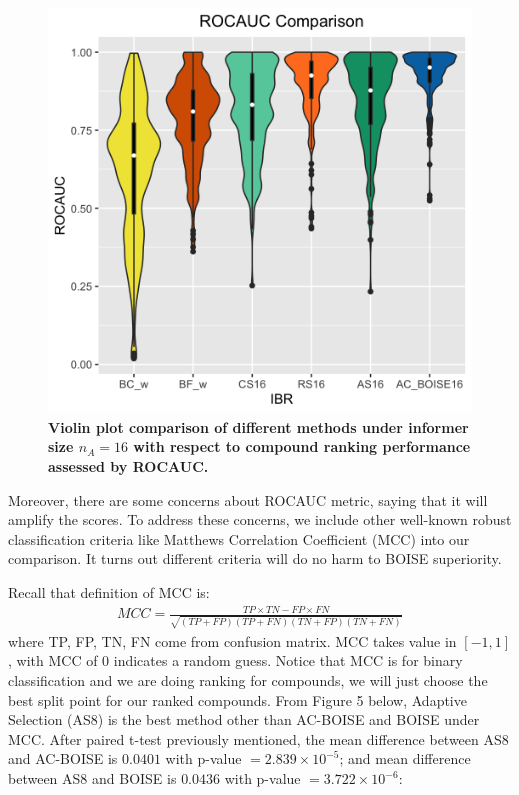 \documentclass[12pt]{article}
\begin{document}
\begin{figure}[!ht]
\caption{\label{fig:auc2} 
{\bf Violin plot comparison of different methods under informer size $n_A =16$ with respect to compound ranking performance assessed by ROCAUC.}} 
\centering
\includegraphics[width=5.0in]{pkis1_16_ROCAUC_AC.png}
\end{figure}

Moreover, there are some concerns about ROCAUC metric, saying that it will amplify the scores. To address these concerns, we include other well-known robust classification criteria like Matthews Correlation Coefficient (MCC) into our comparison. It turns out different criteria will do no harm to BOISE superiority. 

Recall that definition of MCC is:
\begin{eqnarray}
\label{eq:mcc}
MCC = \frac{TP\times TN-FP\times FN}{\sqrt{(TP+FP)(TP+FN)(TN+FP)(TN+FN)}}
\end{eqnarray}
where TP, FP, TN, FN come from confusion matrix. MCC takes value in $[-1,1]$, with MCC of $0$ indicates a random guess. Notice that MCC is for binary classification and we are doing ranking for compounds, we will just choose the best split point for our ranked compounds. From Figure 5 below, Adaptive Selection (AS8) is the best method other than AC-BOISE and BOISE under MCC. After paired t-test previously mentioned, the mean difference between AS8 and AC-BOISE is $0.0401$ with p-value $=2.839\times 10^{-5}$; and  mean difference between AS8 and BOISE is $0.0436$ with p-value $=3.722\times 10^{-6}$:
\end{document}
